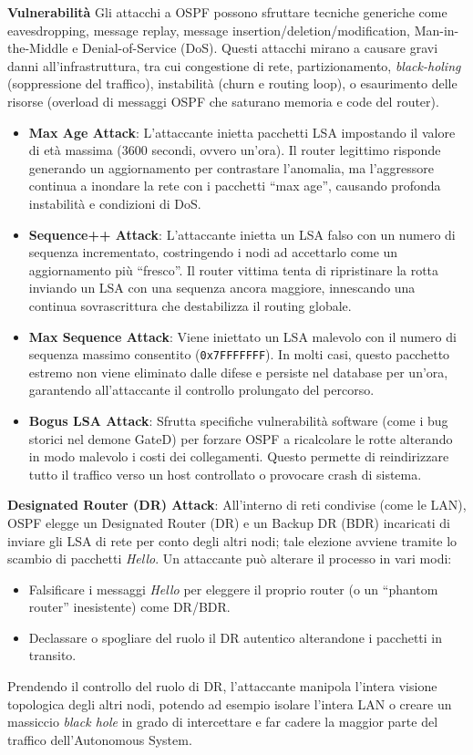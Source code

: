 \documentclass{article}
\begin{document}
\textbf{Vulnerabilità}
Gli attacchi a OSPF possono sfruttare tecniche generiche come eavesdropping, message replay, message insertion/deletion/modification, Man-in-the-Middle e Denial-of-Service (DoS). 
Questi attacchi mirano a causare gravi danni all'infrastruttura, tra cui congestione di rete, partizionamento, \emph{black-holing} (soppressione del traffico), instabilità (churn e routing loop), o esaurimento delle risorse (overload di messaggi OSPF che saturano memoria e code del router).

\begin{itemize}
    \item \textbf{Max Age Attack}: L'attaccante inietta pacchetti LSA impostando il valore di età massima (3600 secondi, ovvero un'ora). Il router legittimo risponde generando un aggiornamento per contrastare l'anomalia, ma l'aggressore continua a inondare la rete con i pacchetti ``max age'', causando profonda instabilità e condizioni di DoS.
    \item \textbf{Sequence++ Attack}: L'attaccante inietta un LSA falso con un numero di sequenza incrementato, costringendo i nodi ad accettarlo come un aggiornamento più ``fresco''. Il router vittima tenta di ripristinare la rotta inviando un LSA con una sequenza ancora maggiore, innescando una continua sovrascrittura che destabilizza il routing globale.
    \item \textbf{Max Sequence Attack}: Viene iniettato un LSA malevolo con il numero di sequenza massimo consentito (\texttt{0x7FFFFFFF}). In molti casi, questo pacchetto estremo non viene eliminato dalle difese e persiste nel database per un'ora, garantendo all'attaccante il controllo prolungato del percorso.
    \item \textbf{Bogus LSA Attack}: Sfrutta specifiche vulnerabilità software (come i bug storici nel demone GateD) per forzare OSPF a ricalcolare le rotte alterando in modo malevolo i costi dei collegamenti. Questo permette di reindirizzare tutto il traffico verso un host controllato o provocare crash di sistema.
\end{itemize}

\textbf{Designated Router (DR) Attack}:
All'interno di reti condivise (come le LAN), OSPF elegge un Designated Router (DR) e un Backup DR (BDR) incaricati di inviare gli LSA di rete per conto degli altri nodi; tale elezione avviene tramite lo scambio di pacchetti \emph{Hello}. Un attaccante può alterare il processo in vari modi:
\begin{itemize}
    \item Falsificare i messaggi \emph{Hello} per eleggere il proprio router (o un ``phantom router'' inesistente) come DR/BDR.
    \item Declassare o spogliare del ruolo il DR autentico alterandone i pacchetti in transito.
\end{itemize}
Prendendo il controllo del ruolo di DR, l'attaccante manipola l'intera visione topologica degli altri nodi, potendo ad esempio isolare l'intera LAN o creare un massiccio \emph{black hole} in grado di intercettare e far cadere la maggior parte del traffico dell'Autonomous System.
\end{document}
